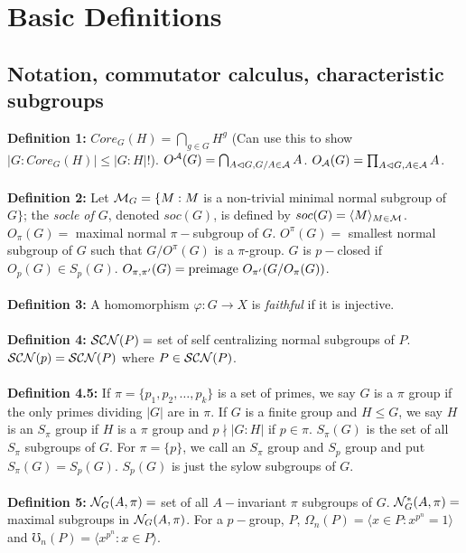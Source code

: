 \chapter{Basic Definitions}
\section{Notation, commutator calculus, characteristic subgroups}
{\bf Definition 1:}
$Core_G(H)= \bigcap_{g \in G} H^g$ (Can use this to show $|G:Core_G(H)|\le |G:H|!$).
$O^{\cal A}(G)= \bigcap_{A \lhd G, G/A \in {\cal A}} A$.
$O_{\cal A}(G)= \prod_{A \lhd G, A \in {\cal A}} A$.\\
\\
{\bf Definition 2:} Let ${\cal M}_G= \{ M: M$ is a non-trivial minimal normal subgroup of $G\}$;
the \emph{socle of $G$}, denoted
$soc(G)$, is defined by
$soc(G)= \langle M \rangle_{M \in {\cal M}}$.
$O_{\pi}(G)=$ maximal normal $\pi-$subgroup of $G$.
$O^{\pi}(G)=$ smallest normal subgroup of $G$ such that $G/O^{\pi}(G)$ is a $\pi$-group.
$G$ is $p-$closed if $O_p(G) \in S_p(G)$.
$O_{\pi , \pi'}(G) = \textnormal{preimage } O_{\pi'}(G/O_{\pi}(G))$.
\\
\\
{\bf Definition 3:}
A homomorphism $\varphi: G \rightarrow X$ is \emph {faithful} if it is injective.
\\
\\
{\bf Definition 4:}
${\cal SCN}(P)=$ set of self centralizing normal subgroups of $P$.
${\cal SCN}(p)= {\cal SCN}(P)$ where $P \in {\cal SCN}(P)$.
\\
\\
{\bf Definition 4.5:} If $\pi = \{ p_1, p_2, \ldots , p_k\}$ is a set of primes, we say
$G$ is a $\pi$ group if the only primes dividing $|G|$ are in $\pi$.  If $G$ is a finite
group and $H \leq G$, we say $H$ is an $S_{\pi}$ group if $H$ is a $\pi$ group and
$p \nmid |G:H|$  if $p \in \pi$.  $S_{\pi}(G)$  is the set of all $S_{\pi}$ subgroups of
$G$. For $\pi = \{ p \}$, we call an $S_{\pi}$ group and $S_p$ group and put $S_{\pi}(G) = S_p(G)$.
$S_p(G)$ is just the sylow subgroups of $G$.
\\
\\
{\bf Definition 5:}
${\cal N}_G(A, \pi)=$ set of all $A-$invariant $\pi$ subgroups of $G$.
${\cal N}_G^*(A, \pi)=$ maximal subgroups in ${\cal N}_G(A, \pi)$.  For a $p-$group, $P$,
$\Omega_n(P)=
\langle x \in P: x^{p^n}=1 \rangle $ and
$\mho_n(P)= \langle x^{p^n}: x \in P \rangle $.
\\
\\
